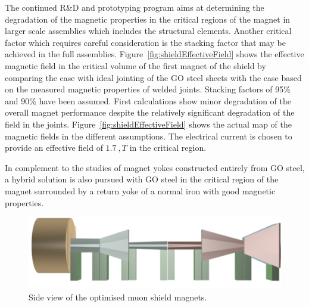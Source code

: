 \documentclass{article}
\begin{document}
The continued R\&D and prototyping program aims at determining the degradation of the magnetic 
properties in the critical regions of the magnet in larger scale assemblies which includes
the structural elements. Another critical factor which requires careful consideration is the
stacking factor that may be achieved in the full assemblies. Figure~\ref{fig:shieldEffectiveField} 
shows the effective magnetic field in the critical volume of the first magnet of the shield 
by comparing the case with ideal jointing of the GO steel sheets with the case based on the 
measured magnetic properties of welded joints. Stacking factors of 95\% and 90\% have been
assumed. First calculations show minor degradation of the overall magnet performance 
despite the relatively significant degradation of the field in the joints. 
Figure~\ref{fig:shieldEffectiveField} shows the actual map of the magnetic fields in the different 
assumptions. The electrical current is chosen to provide an effective field of $1.7~,T$ in the 
critical region.

In complement to the studies of magnet yokes constructed entirely from GO steel, a hybrid solution
is also pursued with GO steel in the critical region of the magnet surrounded by a return yoke of
a normal iron with good magnetic properties.




\begin{figure}[thbp]
\centering
\includegraphics[width=0.9\columnwidth]{figs/shield_YZview.png}
\caption{Side view of the optimised muon shield magnets.}
\label{fig:shieldSideView}
\end{figure}
\end{document}
